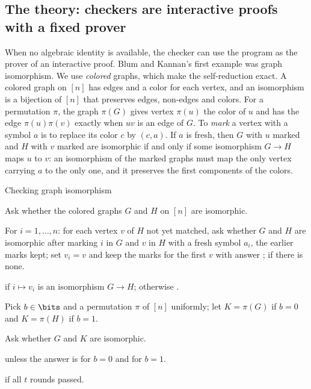 \begin{refsection}
\section{The theory: checkers are interactive proofs with a fixed prover}\label{sec:consistency:ip}

When no algebraic identity is available, the checker can use the program as the prover of an interactive proof. Blum and Kannan's first example was graph isomorphism. We use \emph{colored} graphs, which make the self-reduction exact. A colored graph on $[n]$ has edges and a color for each vertex, and an isomorphism is a bijection of $[n]$ that preserves edges, non-edges and colors. For a permutation $\pi$, the graph $\pi(G)$ gives vertex $\pi(u)$ the color of $u$ and has the edge $\pi(u)\pi(v)$ exactly when $uv$ is an edge of $G$. To \emph{mark} a vertex with a symbol $a$ is to replace its color $c$ by $(c,a)$. If $a$ is fresh, then $G$ with $u$ marked and $H$ with $v$ marked are isomorphic if and only if some isomorphism $G\to H$ maps $u$ to $v$: an isomorphism of the marked graphs must map the only vertex carrying $a$ to the only one, and it preserves the first components of the colors.

\begin{protocol}{Checking graph isomorphism}\label{prot:consistency:gi}
\item[\msg{V}{P}] Ask whether the colored graphs $G$ and $H$ on $[n]$ are isomorphic.
\item[\act{V}] For $i=1,\dots,n$: for each vertex $v$ of $H$ not yet matched, ask whether $G$ and $H$ are isomorphic after marking $i$ in $G$ and $v$ in $H$ with a fresh symbol $a_i$, the earlier marks kept; set $v_i=v$ and keep the marks for the first $v$ with answer \consistencyyes; \rej{} if there is none.
\item[\act{V}] \acc{} if $i\mapsto v_i$ is an isomorphism $G\to H$; otherwise \rej.
\item[\act{V}] Pick $b\in\bits$ and a permutation $\pi$ of $[n]$ uniformly; let $K=\pi(G)$ if $b=0$ and $K=\pi(H)$ if $b=1$.
\item[\msg{V}{P}] Ask whether $G$ and $K$ are isomorphic.
\item[\act{V}] \rej{} unless the answer is \consistencyyes{} for $b=0$ and \consistencyno{} for $b=1$.
\item[\act{V}] \acc{} if all $t$ rounds passed.
\end{protocol}


\end{refsection}

